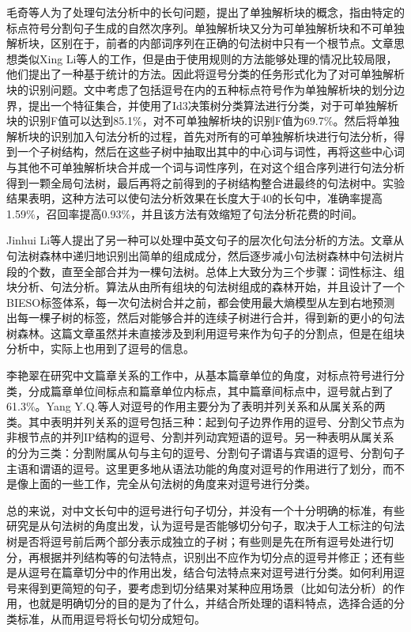 \documentclass[master, winfont]{njuthesis}
\begin{document}
毛奇等人\cite{2007}为了处理句法分析中的长句问题，提出了单独解析块的概念，指由特定的标点符号分割句子生成的自然次序列。单独解析块又分为可单独解析块和不可单独解析块，区别在于，前者的内部词序列在正确的句法树中只有一个根节点。文章思想类似Xing Li等人\cite{Li2004}的工作，但是由于使用规则的方法能够处理的情况比较局限，他们提出了一种基于统计的方法。因此将逗号分类的任务形式化为了对可单独解析块的识别问题。文中考虑了包括逗号在内的五种标点符号作为单独解析块的划分边界，提出一个特征集合，并使用了Id3决策树分类算法进行分类，对于可单独解析块的识别F值可以达到85.1\%，对不可单独解析块的识别F值为69.7\%。然后将单独解析块的识别加入句法分析的过程，首先对所有的可单独解析块进行句法分析，得到一个子树结构，然后在这些子树中抽取出其中的中心词与词性，再将这些中心词与其他不可单独解析块合并成一个词与词性序列，在对这个组合序列进行句法分析得到一颗全局句法树，最后再将之前得到的子树结构整合进最终的句法树中。实验结果表明，这种方法可以使句法分析效果在长度大于40的长句中，准确率提高1.59\%，召回率提高0.93\%，并且该方法有效缩短了句法分析花费的时间。

Jinhui Li等人\cite{Li2008}提出了另一种可以处理中英文句子的层次化句法分析的方法。文章从句法树森林中递归地识别出简单的组成成分，然后逐步减小句法树森林中句法树片段的个数，直至全部合并为一棵句法树。总体上大致分为三个步骤：词性标注、组块分析、句法分析。算法从由所有组块的句法树组成的森林开始，并且设计了一个BIESO标签体系，每一次句法树合并之前，都会使用最大熵模型从左到右地预测出每一棵子树的标签，然后对能够合并的连续子树进行合并，得到新的更小的句法树森林。这篇文章虽然并未直接涉及到利用逗号来作为句子的分割点，但是在组块分析中，实际上也用到了逗号的信息。

李艳翠\cite{liyancui2015}在研究中文篇章关系的工作中，从基本篇章单位的角度，对标点符号进行分类，分成篇章单位间标点和篇章单位内标点，其中篇章间标点中，逗号就占到了61.3\%。Yang Y.Q.等人\cite{Yang2012Chinese}对逗号的作用主要分为了表明并列关系和从属关系的两类。其中表明并列关系的逗号包括三种：起到句子边界作用的逗号、分割父节点为非根节点的并列IP结构的逗号、分割并列动宾短语的逗号。另一种表明从属关系的分为三类：分割附属从句与主句的逗号、分割句子谓语与宾语的逗号、分割句子主语和谓语的逗号。这里更多地从语法功能的角度对逗号的作用进行了划分，而不是像上面的一些工作，完全从句法树的角度来对逗号进行分类。

总的来说，对中文长句中的逗号进行句子切分，并没有一个十分明确的标准，有些研究是从句法树的角度出发，认为逗号是否能够切分句子，取决于人工标注的句法树是否将逗号前后两个部分表示成独立的子树；有些则是先在所有逗号处进行切分，再根据并列结构等的句法特点，识别出不应作为切分点的逗号并修正；还有些是从逗号在篇章切分中的作用出发，结合句法特点来对逗号进行分类。如何利用逗号来得到更简短的句子，要考虑到切分结果对某种应用场景（比如句法分析）的作用，也就是明确切分的目的是为了什么，并结合所处理的语料特点，选择合适的分类标准，从而用逗号将长句切分成短句。
\end{document}
